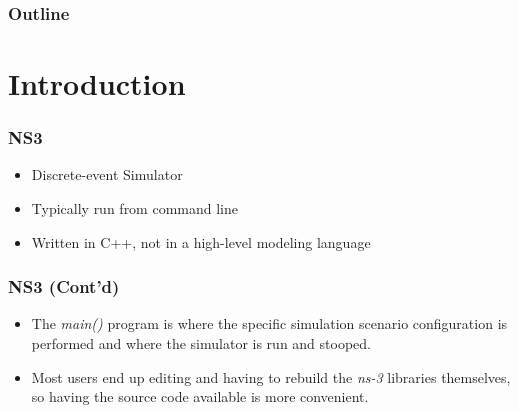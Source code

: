 \documentclass{../iot-lecture}
\subtitle{NS3 Simulation}
\begin{document}
\begin{frame}
  \titlepage{}
\end{frame}
\begin{frame}
  \frametitle{Outline}
  \tableofcontents{}
\end{frame}

\section{Introduction}

\begin{frame}
  \frametitle{NS3}
  \begin{itemize}
    \item Discrete-event Simulator
    \item Typically run from command line
    \item Written in C++, not in a high-level modeling language
  \end{itemize}
\end{frame}

\begin{frame}
  \frametitle{NS3 (Cont'd)}
  \begin{itemize}
    \item The \textit{\color{YellowOrange} main()} program is where the specific simulation scenario configuration
      is performed and where the simulator is run and stooped.
    \item Most users end up editing and having to rebuild the \textit{ns-3} libraries themselves,
      so having the source code available is more convenient.
  \end{itemize}
\end{frame}
\end{document}
